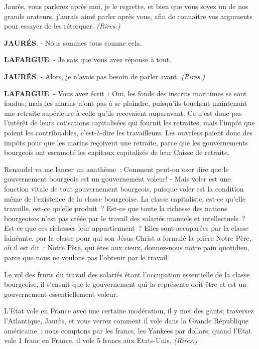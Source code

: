 \documentclass[french,twoside]{book} %
\begin{document}
Jaurès, vous parlerez après moi, je le regrette, et bien que vous soyez un de nos grands orateurs, j’aurais aimé parler après vous, afin de connaître vos arguments pour essayer de les rétorquer. \emph{(Rires.)}\par
\textbf{JAURÉS}. - Nous sommes tous comme cela.\par
\textbf{LAFARGUE}. - Je sais que vous avez réponse à tout.\par
\textbf{JAURÉS}. - Alors, je n’avais pas besoin de parler avant. \emph{(Rires.)}\par
\textbf{LAFARGUE}. - Vous avez écrit : Oui, les fonds des inscrits maritimes se sont fondus; mais les marins n’ont pas à se plaindre, puisqu’ils touchent maintenant une retraite supérieure à celle qu’ils recevaient auparavant. Ce n’est donc pas l’intérêt de leurs cotisations capitalisées qui fournit les retraites, mais l’impôt que paient les contribuables, c’est-à-dire les travailleurs. Les ouvriers paient donc des impôts pour que les marins reçoivent une retraite, parce que les gouvernements bourgeois ont escamoté les capitaux capitalisés de leur Caisse de retraite.\par
Renaudel va me lancer un anathème : Comment peut-on oser dire que le gouvernement bourgeois est un gouvernement voleur! - Mais voler est une fonction vitale de tout gouvernement bourgeois, puisque voler est la condition même de l’existence de la classe bourgeoise. La classe capitaliste, est-ce qu’elle travaille, est-ce qu’elle produit ? Est-ce que toute la richesse des nations bourgeoises n’est pas créée par le travail des salariés manuels et intellectuels ? Est-ce que ces richesses leur appartiennent ? Elles sont accaparées par la classe fainéante, par la classe pour qui son Jésus-Christ a formulé la prière Notre Père, où il est dit : Notre Père, qui êtes aux cieux, donnez-nous notre pain quotidien, parce que nous ne voulons pas l’obtenir par le travail.\par
Le vol des fruits du travail des salariés étant l’occupation essentielle de la classe bourgeoise, il s’ensuit que le gouvernement qui la représente doit être et est un gouvernement essentiellement voleur.\par
L'Etat vole en France avec une certaine modération, il y met des gants; traversez l’Atlantique, Jaurès, et vous verrez comment il vole dans la Grande République américaine : nous comptons par les francs, les Yankees par dollars; quand l’Etat vole 1 franc en France, il vole 5 francs aux Etats-Unis. \emph{(Rires.)}\par
\end{document}

